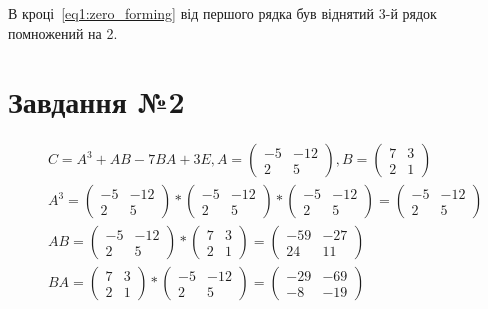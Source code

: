 \documentclass{report}
\begin{document}
В кроці~\eqref{eq1:zero_forming} від першого рядка був віднятий 3-й рядок помножений на 2.

\section{Завдання №2}
\begin{equation}\label{eq2}\begin{split}
	& C = A^{3} + AB -7BA + 3E, A = \begin{pmatrix}-5 & -12\\ 2 & 5\end{pmatrix}, B = \begin{pmatrix}7 & 3\\2 & 1\end{pmatrix} \\
	& A^{3} = \begin{pmatrix}-5 & -12\\ 2 & 5\end{pmatrix} * \begin{pmatrix}-5 & -12\\ 2 & 5\end{pmatrix} * \begin{pmatrix}-5 & -12\\ 2 & 5\end{pmatrix} = \begin{pmatrix}-5 & -12\\ 2 & 5\end{pmatrix} \\
	& AB = \begin{pmatrix}-5 & -12\\ 2 & 5\end{pmatrix} * \begin{pmatrix}7 & 3\\2 & 1\end{pmatrix} = \begin{pmatrix}-59 & -27\\24 & 11\end{pmatrix} \\
	& BA = \begin{pmatrix}7 & 3\\2 & 1\end{pmatrix} *  \begin{pmatrix}-5 & -12\\ 2 & 5\end{pmatrix} =  \begin{pmatrix}-29 & -69\\ -8 & -19\end{pmatrix} \\

\end{split}
\end{equation}
\end{document}
